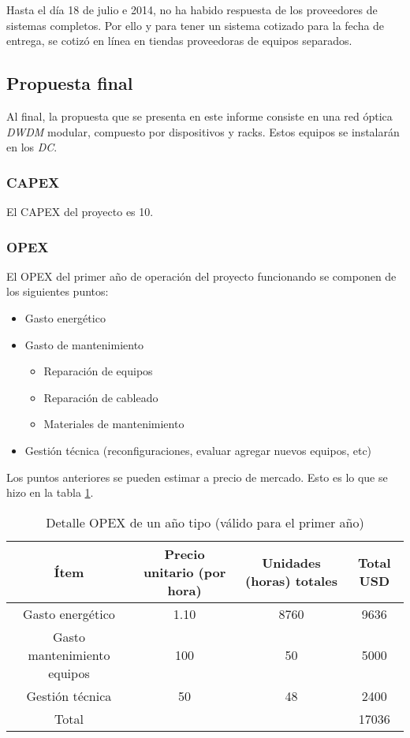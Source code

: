 
Hasta el día 18 de julio e 2014, no ha habido respuesta de los
proveedores de sistemas completos. Por ello y para tener un sistema
cotizado para la fecha de entrega, se cotizó en línea en tiendas
proveedoras de equipos separados.

\subsection{Propuesta final}
\label{sec:ppfinal}

Al final, la propuesta que se presenta en este informe consiste en una
red óptica \emph{DWDM} modular, compuesto por dispositivos y
racks. Estos equipos se instalarán en los \emph{DC}.

\subsubsection{CAPEX}
\label{sec:capex}

El CAPEX del proyecto es 10.

\subsubsection{OPEX}
\label{sec:opex}

El OPEX del primer año de operación del proyecto funcionando se
componen de los siguientes puntos:
\begin{itemize}
\item Gasto energético
\item Gasto de mantenimiento
  \begin{itemize}
  \item Reparación de equipos
  \item Reparación de cableado
  \item Materiales de mantenimiento
  \end{itemize}
\item Gestión técnica (reconfiguraciones, evaluar agregar nuevos
  equipos, etc)
\end{itemize}

Los puntos anteriores se pueden estimar a precio de mercado. Esto es
lo que se hizo en la tabla \ref{tab:opex}.

\begin{table}[H]
  \centering
  \begin{tabular}{| c | c | c | c |}
    \hline{}
    Ítem & Precio unitario (por hora) & Unidades (horas) totales & Total USD \\
    \hline{}
    Gasto energético & 1.10 & 8760 & 9636 \\
    \hline{}
    Gasto mantenimiento equipos & 100 & 50 & 5000 \\
    \hline{}
    Gestión técnica & 50 & 48 & 2400 \\
    \hline{}
    Total & & & 17036 \\
    \hline
  \end{tabular}
  \caption{Detalle OPEX de un año tipo (válido para el primer año)}
  \label{tab:opex}
\end{table}